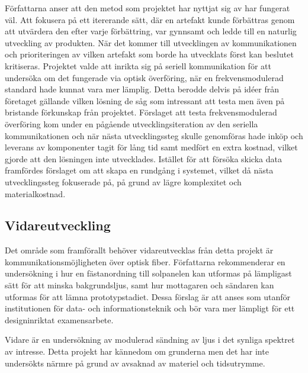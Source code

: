         Författarna anser att den metod som projektet har nyttjat sig av har fungerat väl. Att fokusera på ett itererande sätt, där en artefakt kunde förbättras genom att utvärdera den efter varje förbättring, var gynnsamt och ledde till en naturlig utveckling av produkten. När det kommer till utvecklingen av kommunikationen och prioriteringen av vilken artefakt som borde ha utvecklats först kan beslutet kritiseras. Projektet valde att inrikta sig på seriell kommunikation för att undersöka om det fungerade via optisk överföring, när en frekvensmodulerad standard hade kunnat vara mer lämplig. Detta berodde delvis på idéer från företaget gällande vilken lösning de såg som intressant att testa men även på bristande förkunskap från projektet. Förslaget att testa frekvensmodulerad överföring kom under en pågående utvecklingsiteration av den seriella kommunikationen och när nästa utvecklingssteg skulle genomföras hade inköp och leverans av komponenter tagit för lång tid samt medfört en extra kostnad, vilket gjorde att den lösningen inte utvecklades. Istället för att försöka skicka data framfördes förslaget om att skapa en rundgång i systemet, vilket då nästa utvecklingssteg fokuserade på, på grund av lägre komplexitet och materialkostnad.

    \subsection{Vidareutveckling} %
    \label{sub:vidareutveckling}
        Det område som framförallt behöver vidareutvecklas från detta projekt är kommunikationsmöjligheten över optisk fiber. Författarna rekommenderar en undersökning i hur en fästanordning till solpanelen kan utformas på lämpligast sätt för att minska bakgrundsljus, samt hur mottagaren och sändaren kan utformas för att lämna prototypstadiet. Dessa förslag är att anses som utanför institutionen för data- och informationsteknik och bör vara mer lämpligt för ett designinriktat examensarbete. \bigskip

        Vidare är en undersökning av modulerad sändning av ljus i det synliga spektret av intresse. Detta projekt har kännedom om grunderna men det har inte undersökts närmre på grund av avsaknad av materiel och tidsutrymme.
    
